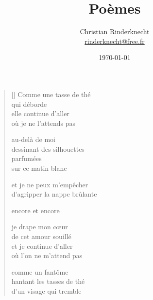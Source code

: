 \documentclass[12pt,a4paper]{article}
\title{Poèmes}
\author{Christian Rinderknecht\\
{\small \url{rinderknecht@free.fr}}}
\date{\today}
\begin{document}
\maketitle

\thispagestyle{empty}

\newpage\leavevmode\thispagestyle{empty}\newpage


\newpage

\poemtitle{}

\settowidth{\versewidth}{d'agripper le nappe brûlante}

\bigskip

\begin{verse}[\versewidth]
  Comme une tasse de thé \\
  qui déborde \\

  elle continue d'aller \\
  où je ne l'attends pas

  au-delà de moi \\
  dessinant des silhouettes \\
  parfumées \\
  sur ce matin blanc

  et je ne peux m'empêcher \\
  d'agripper la nappe brûlante

  encore et encore

  je drape mon cœur \\
  de cet amour souillé \\
  et je continue d'aller \\
  où l'on ne m'attend pas

  comme un fantôme \\
  hantant les tasses de thé \\
  d'un visage qui tremble
\end{verse}


\newpage

\poemtitle{}

\settowidth{\versewidth}{J'aimerais que nous soyons eux}

\bigskip
\end{document}

